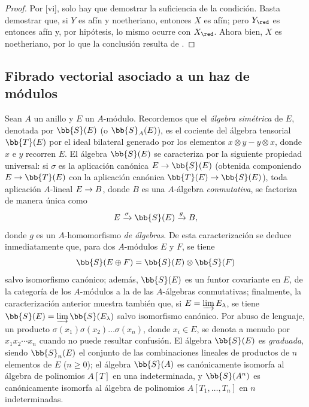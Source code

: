 \documentclass[oneside,10pt]{amsart}
\makeatletter
\renewcommand{\geq}{\geqslant}
\newcommand{\ega@arrow}[2]{\mathchoice{#1}{#2}{#2}{#2}}
\renewcommand{\to}{\ega@arrow{\longrightarrow}{\rightarrow}}
\newcommand{\oldpage}[2][]{\marginnote{\normalfont\footnotesize\textbf{#1}~|~#2}\ignorespaces}
\let\EGAOriginalLabel\label
\renewcommand{\label}[1]{\phantomsection\EGAOriginalLabel{#1}}
\makeatother
\begin{document}
\begin{proof}
Por [vi], solo hay que demostrar la suficiencia de la condición.
Basta demostrar que, si $Y$ es afín y noetheriano, entonces $X$ es afín; pero $Y_\red$ es entonces afín y, por hipótesis, lo mismo ocurre con $X_\red$.
Ahora bien, $X$ es noetheriano, por lo que la conclusión resulta de .
\end{proof}

\subsection{Fibrado vectorial asociado a un haz de módulos}
\label{subsection:II.1.7}

\begin{env}[1.7.1]
\label{II.1.7.1}
Sean $A$ un anillo y $E$ un $A$-módulo.
Recordemos que el \emph{álgebra simétrica} de $E$, denotada por $\bb{S}(E)$ (o $\bb{S}_A(E)$), es el cociente del álgebra tensorial $\bb{T}(E)$ por el ideal bilateral generado por los elementos $x\otimes y-y\otimes x$, donde $x$ e $y$ recorren $E$.
El álgebra $\bb{S}(E)$ se caracteriza por la siguiente propiedad universal: si $\sigma$ es la aplicación canónica $E\to\bb{S}(E)$ (obtenida componiendo $E\to\bb{T}(E)$ con la aplicación canónica $\bb{T}(E)\to\bb{S}(E)$), toda aplicación $A$-lineal $E\to B$, donde $B$ es una $A$-álgebra \emph{conmutativa}, se factoriza de manera única como
\[
  E\xrightarrow{\sigma}\bb{S}(E)\xrightarrow{g}B,
\]
donde $g$ es un $A$-homomorfismo \emph{de álgebras}.
De esta caracterización se deduce inmediatamente que, para dos $A$-módulos $E$ y $F$, se tiene
\[
  \bb{S}(E\oplus F)=\bb{S}(E)\otimes\bb{S}(F)
\]
\oldpage[II]{15}
salvo isomorfismo canónico; además, $\bb{S}(E)$ es un funtor covariante en $E$, de la categoría de los $A$-módulos a la de las $A$-álgebras conmutativas; finalmente, la caracterización anterior muestra también que, si $E=\varinjlim E_\lambda$, se tiene $\bb{S}(E)=\varinjlim\bb{S}(E_\lambda)$ salvo isomorfismo canónico.
Por abuso de lenguaje, un producto $\sigma(x_1)\sigma(x_2)\ldots\sigma(x_n)$, donde $x_i\in E$, se denota a menudo por $x_1x_2\cdots x_n$ cuando no puede resultar confusión.
El álgebra $\bb{S}(E)$ es \emph{graduada}, siendo $\bb{S}_n(E)$ el conjunto de las combinaciones lineales de productos de $n$ elementos de $E$ ($n\geq0$); el álgebra $\bb{S}(A)$ es canónicamente isomorfa al álgebra de polinomios $A[T]$ en una indeterminada, y $\bb{S}(A^n)$ es canónicamente isomorfa al álgebra de polinomios $A[T_1,\dots,T_n]$ en $n$ indeterminadas.
\end{env}
\end{document}
